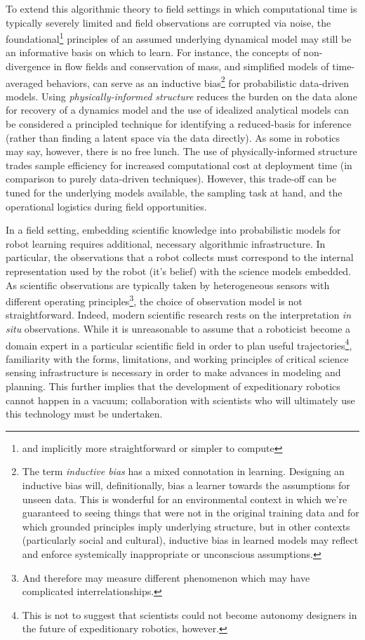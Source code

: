 To extend this algorithmic theory to field settings in which computational time is typically severely limited and field observations are corrupted via noise, the foundational\footnote{and implicitly more straightforward or simpler to compute} principles of an assumed underlying dynamical model may still be an informative basis on which to learn.
For instance, the concepts of non-divergence in flow fields and conservation of mass, and simplified models of time-averaged behaviors, can serve as an inductive bias\footnote{The term \emph{inductive bias} has a mixed connotation in learning. Designing an inductive bias will, definitionally, bias a learner towards the assumptions for unseen data. This is wonderful for an environmental context in which we're guaranteed to seeing things that were not in the original training data and for which grounded principles imply underlying structure, but in other contexts (particularly social and cultural), inductive bias in learned models may reflect and enforce systemically inappropriate or unconscious assumptions.} for probabilistic data-driven models.
Using \emph{physically-informed structure} reduces the burden on the data alone for recovery of a dynamics model and the use of idealized analytical models can be considered a principled technique for identifying a reduced-basis for inference (rather than finding a latent space via the data directly).
As some in robotics may say, however, there is no free lunch.
The use of physically-informed structure trades sample efficiency for increased computational cost at deployment time (in comparison to purely data-driven techniques).
However, this trade-off can be tuned for the underlying models available, the sampling task at hand, and the operational logistics during field opportunities.

In a field setting, embedding scientific knowledge into probabilistic models for robot learning requires additional, necessary algorithmic infrastructure. 
In particular, the observations that a robot collects must correspond to the internal representation used by the robot (it's belief) with the science models embedded.
As scientific observations are typically taken by heterogeneous sensors with different operating principles\footnote{And therefore may measure different phenomenon which may have complicated interrelationships.}, the choice of observation model is not straightforward.
Indeed, modern scientific research rests on the interpretation \emph{in situ} observations.
While it is unreasonable to assume that a roboticist become a domain expert in a particular scientific field in order to plan useful trajectories\footnote{This is not to suggest that scientists could not become autonomy designers in the future of expeditionary robotics, however.}, familiarity with the forms, limitations, and working principles of critical science sensing infrastructure is necessary in order to make advances in modeling and planning.
This further implies that the development of expeditionary robotics cannot happen in a vacuum; collaboration with scientists who will ultimately use this technology must be undertaken.

